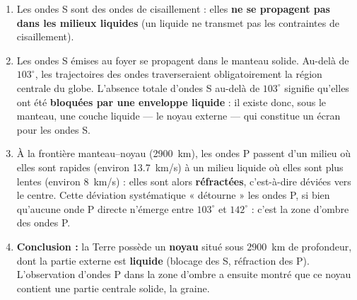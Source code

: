\documentclass[11pt]{article}
\newcommand{\cle}[1]{{\popxbold\color{popdark}#1}}
\begin{document}
\begin{corrige}
\begin{enumerate}
\item Les ondes S sont des ondes de cisaillement : elles \textbf{ne se propagent pas dans les milieux liquides} (un liquide ne transmet pas les contraintes de cisaillement).
\item Les ondes S émises au foyer se propagent dans le manteau solide. Au-delà de $103^{\circ}$, les trajectoires des ondes traverseraient obligatoirement la région centrale du globe. L'absence totale d'ondes S au-delà de $103^{\circ}$ signifie qu'elles ont été \textbf{bloquées par une enveloppe liquide} : il existe donc, sous le manteau, une couche liquide — le noyau externe — qui constitue un écran pour les ondes S.
\item À la frontière manteau--noyau (\SI{2900}{km}), les ondes P passent d'un milieu où elles sont rapides (environ \SI{13,7}{km/s}) à un milieu liquide où elles sont plus lentes (environ \SI{8}{km/s}) : elles sont alors \textbf{réfractées}, c'est-à-dire déviées vers le centre. Cette déviation systématique « détourne » les ondes P, si bien qu'aucune onde P directe n'émerge entre $103^{\circ}$ et $142^{\circ}$ : c'est la \cle{zone d'ombre} des ondes P.
\item \textbf{Conclusion :} la Terre possède un \textbf{noyau} situé sous \SI{2900}{km} de profondeur, dont la partie externe est \textbf{liquide} (blocage des S, réfraction des P). L'observation d'ondes P dans la zone d'ombre a ensuite montré que ce noyau contient une partie centrale solide, la graine.
\end{enumerate}
\end{corrige}
\end{document}
